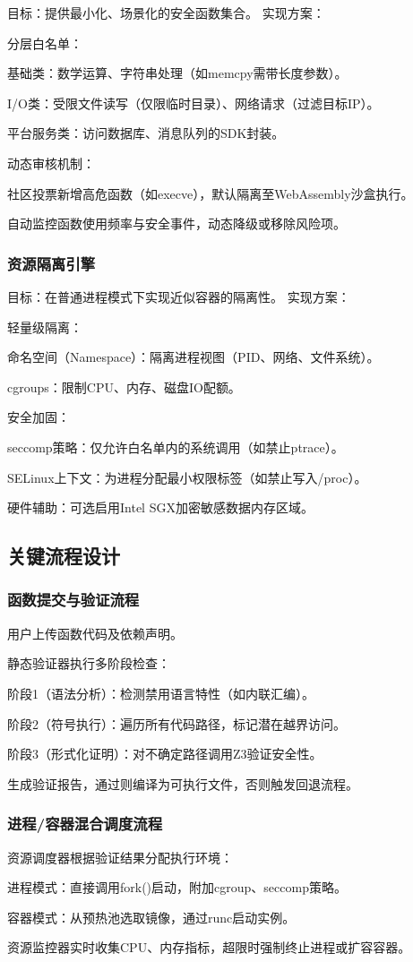 目标：提供最小化、场景化的安全函数集合。
实现方案：

分层白名单：

基础类：数学运算、字符串处理（如memcpy需带长度参数）。

I/O类：受限文件读写（仅限临时目录）、网络请求（过滤目标IP）。

平台服务类：访问数据库、消息队列的SDK封装。

动态审核机制：

社区投票新增高危函数（如execve），默认隔离至WebAssembly沙盒执行。

自动监控函数使用频率与安全事件，动态降级或移除风险项。

\subsubsection{资源隔离引擎}
目标：在普通进程模式下实现近似容器的隔离性。
实现方案：

轻量级隔离：

命名空间（Namespace）：隔离进程视图（PID、网络、文件系统）。

cgroups：限制CPU、内存、磁盘IO配额。

安全加固：

seccomp策略：仅允许白名单内的系统调用（如禁止ptrace）。

SELinux上下文：为进程分配最小权限标签（如禁止写入/proc）。

硬件辅助：可选启用Intel SGX加密敏感数据内存区域。

\subsection{关键流程设计}

\subsubsection{函数提交与验证流程}

用户上传函数代码及依赖声明。

静态验证器执行多阶段检查：

阶段1（语法分析）：检测禁用语言特性（如内联汇编）。

阶段2（符号执行）：遍历所有代码路径，标记潜在越界访问。

阶段3（形式化证明）：对不确定路径调用Z3验证安全性。

生成验证报告，通过则编译为可执行文件，否则触发回退流程。

\subsubsection{进程/容器混合调度流程}
资源调度器根据验证结果分配执行环境：

进程模式：直接调用fork()启动，附加cgroup、seccomp策略。

容器模式：从预热池选取镜像，通过runc启动实例。

资源监控器实时收集CPU、内存指标，超限时强制终止进程或扩容容器。
